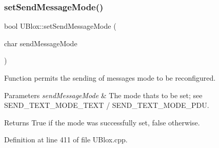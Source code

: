 \subsubsection{\texorpdfstring{set\+Send\+Message\+Mode()}{setSendMessageMode()}}
{\footnotesize\ttfamily bool U\+Blox\+::set\+Send\+Message\+Mode (\begin{DoxyParamCaption}\item[{char}]{send\+Message\+Mode }\end{DoxyParamCaption})}

Function permits the sending of messages mode to be reconfigured.


\begin{DoxyParams}{Parameters}
{\em send\+Message\+Mode} & The mode that\textquotesingle{}s to be set; see S\+E\+N\+D\+\_\+\+T\+E\+X\+T\+\_\+\+M\+O\+D\+E\+\_\+\+T\+E\+XT / S\+E\+N\+D\+\_\+\+T\+E\+X\+T\+\_\+\+M\+O\+D\+E\+\_\+\+P\+DU. \\
\hline
\end{DoxyParams}
\begin{DoxyReturn}{Returns}
True if the mode was successfully set, false otherwise. 
\end{DoxyReturn}


Definition at line 411 of file U\+Blox.\+cpp.


